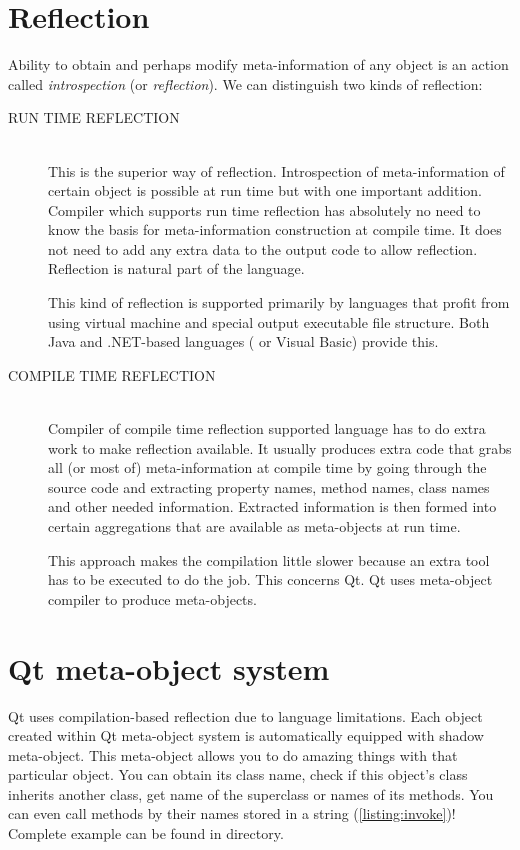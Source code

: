 \section{Reflection}
Ability to obtain and perhaps modify meta-information of any object is an action called \textit{introspection} (or \textit{reflection}). We can distinguish two kinds of reflection:
\begin{description}
\item[RUN TIME REFLECTION] \hfill \\
This is the superior way of reflection. Introspection of meta-information of certain object is possible at run time but with one important addition. Compiler which supports run time reflection has absolutely no need to know the basis for meta-information construction at compile time. It does not need to add any extra data to the output code to allow reflection. Reflection is natural part of the language.

This kind of reflection is supported primarily by languages that profit from using virtual machine and special output executable file structure. Both Java and .NET-based languages (\eg \csharp{} or Visual Basic) \citep[p.~333]{nigel:csharp} provide this.
\item[COMPILE TIME REFLECTION] \hfill \\
Compiler of compile time reflection supported language has to do extra work to make reflection available. It usually produces extra code that grabs all (or most of) meta-information at compile time by going through the source code and extracting property names, method names, class names and other needed information. Extracted information is then formed into certain aggregations that are available as meta-objects at run time.

This approach makes the compilation little slower because an extra tool has to be executed to do the job. This concerns Qt. Qt uses meta-object compiler to produce meta-objects.
\end{description}

\section{Qt meta-object system}
Qt uses compilation-based reflection due to \cpp{} language limitations. Each object created within Qt meta-object system is automatically equipped with shadow meta-object. This meta-object allows you to do amazing things with that particular object. You can obtain its class name, check if this object's class inherits another class, get name of the superclass or names of its methods. You can even call methods by their names stored in a string (\autoref{listing:invoke})! Complete example can be found in directory.

